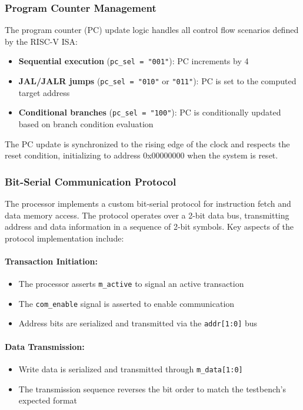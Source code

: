 \documentclass[12pt]{article}
\begin{document}
\subsubsection{Program Counter Management}

The program counter (PC) update logic handles all control flow scenarios defined by the RISC-V ISA:

\begin{itemize}
    \item \textbf{Sequential execution} (\texttt{pc\_sel = "001"}): PC increments by 4
    \item \textbf{JAL/JALR jumps} (\texttt{pc\_sel = "010"} or \texttt{"011"}): PC is set to the computed target address
    \item \textbf{Conditional branches} (\texttt{pc\_sel = "100"}): PC is conditionally updated based on branch condition evaluation
\end{itemize}

The PC update is synchronized to the rising edge of the clock and respects the reset condition, initializing to address 0x00000000 when the system is reset.

\subsubsection{Bit-Serial Communication Protocol}

The processor implements a custom bit-serial protocol for instruction fetch and data memory access. The protocol operates over a 2-bit data bus, transmitting address and data information in a sequence of 2-bit symbols. Key aspects of the protocol implementation include:

\paragraph{Transaction Initiation:}
\begin{itemize}
    \item The processor asserts \texttt{m\_active} to signal an active transaction
    \item The \texttt{com\_enable} signal is asserted to enable communication
    \item Address bits are serialized and transmitted via the \texttt{addr[1:0]} bus
\end{itemize}

\paragraph{Data Transmission:}
\begin{itemize}
    \item Write data is serialized and transmitted through \texttt{m\_data[1:0]}
    \item The transmission sequence reverses the bit order to match the testbench's expected format
\end{itemize}
\end{document}
